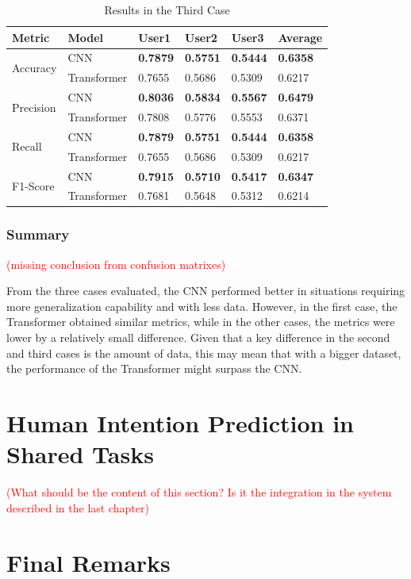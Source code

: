 \begin{table}[H]
    \centering
    \caption{Results in the Third Case}
    \label{table:results_third_case}
    \begin{tabular}{|l|l|l|l|l|l|}
        \hline
        Metric & Model & User1 & User2 & User3 & Average \\
        \hline \hline
        \multirow{2}{*}{Accuracy} & CNN & \textbf{0.7879} & \textbf{0.5751} & \textbf{0.5444} & \textbf{0.6358} \\
        \cline{2-6}
        & Transformer & 0.7655 & 0.5686 & 0.5309 & 0.6217 \\
        \hline \hline
        \multirow{2}{*}{Precision} & CNN & \textbf{0.8036} & \textbf{0.5834} & \textbf{0.5567} & \textbf{0.6479} \\
        \cline{2-6}
        & Transformer & 0.7808 & 0.5776 & 0.5553 & 0.6371 \\
        \hline \hline
        \multirow{2}{*}{Recall} & CNN & \textbf{0.7879} & \textbf{0.5751} & \textbf{0.5444} & \textbf{0.6358} \\
        \cline{2-6}
        & Transformer & 0.7655 & 0.5686 & 0.5309 & 0.6217 \\
        \hline \hline
        \multirow{2}{*}{F1-Score} & CNN & \textbf{0.7915} & \textbf{0.5710} & \textbf{0.5417} & \textbf{0.6347} \\
        \cline{2-6}
        & Transformer & 0.7681 & 0.5648 & 0.5312 & 0.6214 \\
        \hline
    \end{tabular}
\end{table}

\subsubsection{Summary}

\textcolor{red}{(missing conclusion from confusion matrixes)}

From the three cases evaluated, the CNN performed better in situations requiring more generalization capability and with less data. However, in the first case, the Transformer obtained similar metrics, while in the other cases, the metrics were lower by a relatively small difference. Given that a key difference in the second and third cases is the amount of data, this may mean that with a bigger dataset, the performance of the Transformer might surpass the CNN.

\section{Human Intention Prediction in Shared Tasks}

\textcolor{red}{(What should be the content of this section? Is it the integration in the system described in the last chapter)}

\section{Final Remarks}
